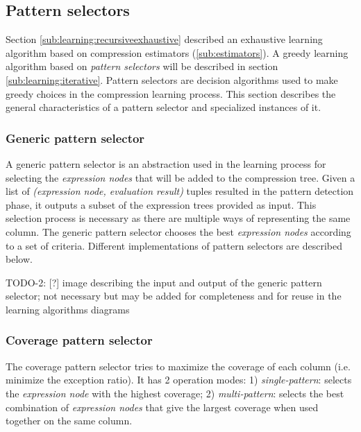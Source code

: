 \subsection{Pattern selectors}
\label{sub:learning:selectors}


\graphicspath{{5_automatic_learning/learning_process/images/}}

% 

Section \ref{sub:learning:recursiveexhaustive} described an exhaustive learning algorithm based on compression estimators (\ref{sub:estimators}). A greedy learning algorithm based on \emph{pattern selectors} will be described in section \ref{sub:learning:iterative}. Pattern selectors are decision algorithms used to make greedy choices in the compression learning process. This section describes the general characteristics of a pattern selector and specialized instances of it.

\subsubsection{Generic pattern selector}
\label{subsubsec:ps:generic}

A generic pattern selector is an abstraction used in the learning process for selecting the \textit{expression nodes} that will be added to the compression tree. Given a list of \textit{(expression node, evaluation result)} tuples resulted in the pattern detection phase, it outputs a subset of the expression trees provided as input. This selection process is necessary as there are multiple ways of representing the same column. The generic pattern selector chooses the best \textit{expression nodes} according to a set of criteria. Different implementations of pattern selectors are described below.

TODO-2: [?] image describing the input and output of the generic pattern selector; not necessary but may be added for completeness and for reuse in the learning algorithms diagrams

\subsubsection{Coverage pattern selector}
\label{subsubsec:ps:coverage}

The coverage pattern selector tries to maximize the coverage of each column (i.e. minimize the exception ratio). It has 2 operation modes: 1) \textit{single-pattern}: selects the \textit{expression node} with the highest coverage; 2) \textit{multi-pattern}: selects the best combination of \textit{expression nodes} that give the largest coverage when used together on the same column.

